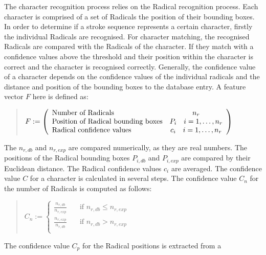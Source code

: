 The character recognition process relies on the Radical recognition process.
Each character is comprised of a set of Radicals the position of their 
bounding boxes.
In order to determine if a stroke sequence represents a certain character,
firstly the individual Radicals are recognised. For character matching,
the recognised Radicals are compared with the Radicals of the character.
If they match with a confidence values above the threshold and their position 
within the character is correct and the character is recognised correctly.
Generally, the confidence value of a character depends on the confidence values
of the individual radicals and the distance and position of the bounding boxes
to the database entry. A feature vector \(F \) here is defined as:
\begin{quote}
\(
    F :=
    \left( 
    \begin {array} {l c} 
        \text{Number of Radicals} & n_{r} \\
        \text{Position of Radical bounding boxes} & 
                                   P_i \quad i = 1, \ldots, n_{r} \\
        \text{Radical confidence values} & c_{i} \quad i = 1, \ldots, n_{r} \\
    \end {array} 
    \right)
\)
\end{quote}
The \(n_{r,db} \) and \(n_{r,exp} \) are compared numerically, as they are real 
numbers. The positions of the Radical bounding boxes \(P_{i,db} \) and 
\(P_{i,exp} \) are compared by their Euclidean distance.
The Radical confidence values \(c_i\) are averaged.
The confidence value \(C\) for a character is calculated in several steps.
The confidence value \(C_n\) for the number of Radicals is computed as follows:
\begin{quote}
\(
   C_n := 
   \begin{cases}
     \frac{n_{r,db}}{n_{r,exp}} & \quad \text{if } n_{r,db} \leq n_{r,exp} \\
     \frac{n_{r,exp}}{n_{r,db}} & \quad \text{if } n_{r,db} > n_{r,exp} \\
   \end{cases}
\)
\end{quote}
The confidence value \(C_p\) for the Radical positions is extracted from a 
